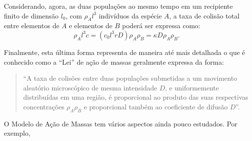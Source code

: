     Considerando, agora, as duas populações ao mesmo tempo em um recipiente finito de dimensão \(l_0\), com \(\rho_A l^{3}\) indivíduos da espécie \(A\), a taxa de colisão total entre elementos de \(A\) e elementos de \(B\) poderá ser expressa como:
    \[\rho_A l^3 c = (c_0 l^3 r D) \rho_A \rho_B = \kappa D\rho_A \rho_B.\]

    Finalmente, esta última forma representa de maneira até mais detalhada o que é conhecido como a ``Lei'' de ação de massas geralmente expressa da forma:

    \begin{quotation}
    ``A taxa de colisões entre duas populações submetidas a um movimento aleatório
    microscópico de mesma intensidade \(D\), e uniformemente distribuídas em uma região, é
    proporcional ao produto das suas respectivas concentrações \(\rho_A \rho_B\) e proporcional também ao coeficiente de difusão \(D\)''.
    \end{quotation}

    O Modelo de Ação de Massas tem vários aspectos ainda pouco estudados. Por exemplo,

